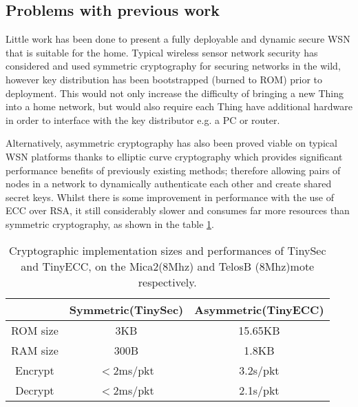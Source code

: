 \documentclass{mprop}
\begin{document}
\subsection{Problems with previous work} %
\label{sub:problems_with_previous_work}

Little work has been done to present a fully deployable and dynamic secure WSN that is suitable for the home. Typical wireless sensor network security has considered and used symmetric cryptography\cite{TinySec,MiniSec, ContikiSec} for securing networks in the wild, however key distribution has been bootstrapped (burned to ROM) prior to deployment. This would not only increase the difficulty of bringing a new Thing into a home network, but would also require each Thing have additional hardware in order to interface with the key distributor e.g. a PC or router. 

Alternatively, asymmetric cryptography has also been proved viable on typical WSN platforms thanks to elliptic curve cryptography which provides significant performance benefits of previously existing methods\cite{TinyECC}; therefore allowing pairs of nodes in a network to dynamically authenticate each other and create shared secret keys. Whilst there is some improvement in performance with the use of ECC over RSA, it still considerably slower and consumes far more resources than symmetric cryptography, as shown in the table \ref{tab:crypto_compare}.

\begin{table}[h] %
  \begin{center} 
  \begin{tabular}{|c|c|c|} 
  \hline
           & Symmetric(TinySec) & Asymmetric(TinyECC) \\ \hline
  ROM size & 3KB                & 15.65KB \\ \hline
  RAM size & 300B               & 1.8KB \\ \hline
  Encrypt  & $<$2ms/pkt         & 3.2s/pkt \\ \hline 
  Decrypt  & $<$2ms/pkt         & 2.1s/pkt \\ \hline
  \end{tabular}
  \caption[]{Cryptographic implementation sizes and performances of TinySec and TinyECC, on the Mica2(8Mhz) and TelosB (8Mhz)mote respectively\footnotemark. \cite{TinySec,TinyECC}}
  \label{tab:crypto_compare}
  \end{center}
\end{table}
\end{document}
